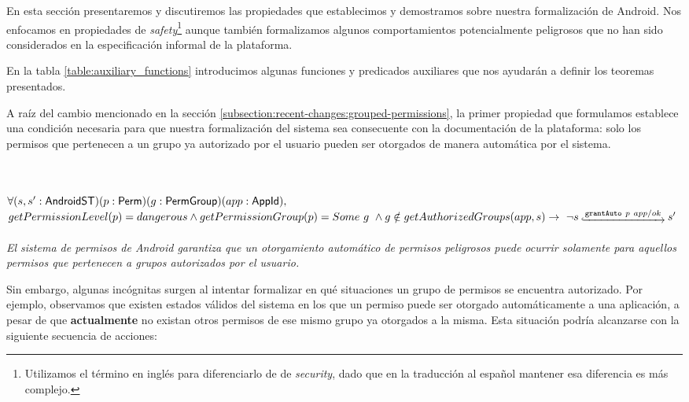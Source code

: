 En esta sección presentaremos y discutiremos las propiedades que establecimos y demostramos sobre
nuestra formalización de Android. Nos enfocamos en propiedades de \textit{safety}\footnote{Utilizamos
el término en inglés para diferenciarlo de de \textit{security}, dado que en la traducción al español
mantener esa diferencia es más complejo.} aunque también formalizamos algunos comportamientos
potencialmente peligrosos que no han sido considerados en la especificación informal de la plataforma.

En la tabla \ref{table:auxiliary_functions} introducimos algunas funciones y predicados auxiliares que
nos ayudarán a definir los teoremas presentados.



A raíz del cambio mencionado en la sección \ref{subsection:recent-changes:grouped-permissions}, la
primer propiedad que formulamos establece una condición necesaria para que nuestra formalización del
sistema sea consecuente con la documentación de la plataforma: solo los permisos que pertenecen a un
grupo ya autorizado por el usuario pueden ser otorgados de manera automática por el sistema.

\begin{prop} \label{section:formalization:property1}
   \mbox{} \\ \\
   $\forall (s,s': \mathsf{AndroidST}) (p:\mathsf{Perm}) (g:\mathsf{PermGroup}) (app:\mathsf{AppId}),$ \\
   $getPermissionLevel(p) = dangerous \land getPermissionGroup(p) = Some\ g\ \land
   g \notin getAuthorizedGroups(app,s)
   \rightarrow\ \neg \Mathexecrel{s}{\texttt{grantAuto}~p~app/ok}{s'}$ \\ \\
   \textit{El sistema de permisos de Android garantiza que un otorgamiento automático de permisos peligrosos puede ocurrir solamente para aquellos permisos que pertenecen a grupos autorizados por el usuario.}
\end{prop}

Sin embargo, algunas incógnitas surgen al intentar formalizar en qué situaciones un grupo de permisos
se encuentra autorizado. Por ejemplo, observamos que existen estados válidos del sistema en los que un
permiso puede ser otorgado automáticamente a una aplicación, a pesar de que \textbf{actualmente} no
existan otros permisos de ese mismo grupo ya otorgados a la misma. Esta situación podría alcanzarse
con la siguiente secuencia de acciones:


